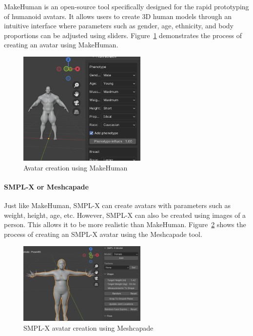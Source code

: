 \documentclass[../../main.tex]{subfiles}
\begin{document}
MakeHuman is an open-source tool specifically designed for the rapid prototyping of humanoid avatars. It allows users to create 3D human models through an intuitive interface where parameters such as gender, age, ethnicity, and body proportions can be adjusted using sliders. Figure~\ref{fig:makehuman_example} demonstrates the process of creating an avatar using MakeHuman.

\begin{figure} 
  \centering \includegraphics[width = 2.5in]{chapters/background_work/images/makehuman_example.png} 
  \caption{Avatar creation using MakeHuman} 
  \label{fig:makehuman_example} 
\end{figure}

\paragraph{SMPL-X or Meshcapade}
\label{ch:background_work:sign_language_synthesis:3d_techniques:procedural_avatar_creation:smpl_x_meshcapade}

Just like MakeHuman, SMPL-X can create avatars with parameters such as weight, height, age, etc. However, SMPL-X can also be created using images of a person. This allows it to be more realistic than MakeHuman. Figure~\ref{fig:smpl_creation_example} shows the process of creating an SMPL-X avatar using the Meshcapade tool.

\begin{figure} 
  \centering \includegraphics[width = 2.5in]{chapters/background_work/images/smpl_creation_example.png} 
  \caption{SMPL-X avatar creation using Meshcapade} 
  \label{fig:smpl_creation_example} 
\end{figure}
\end{document}
